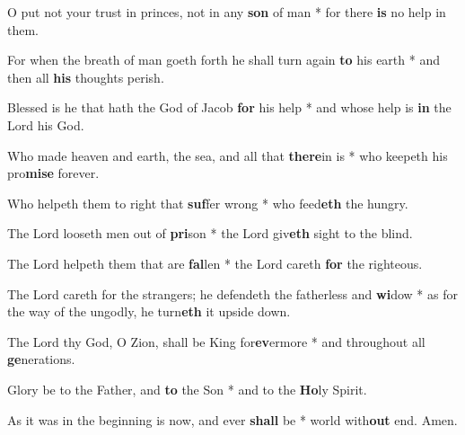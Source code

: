 \begin{multicols}{2}
	O put not your trust in princes, not in any \textbf{son} of man * for there \textbf{is} no help in them.
	
	For when the breath of man goeth forth he shall turn again \textbf{to} his earth * and then all \textbf{his} thoughts perish.
	
	Blessed is he that hath the God of Jacob \textbf{for} his help * and whose help is \textbf{in} the Lord his God.
	
	Who made heaven and earth, the sea, and all that \textbf{there}in is * who keepeth his pro\textbf{mise} forever.
	
	Who helpeth them to right that \textbf{suf}fer wrong * who feed\textbf{eth} the hungry.
	
	The Lord looseth men out of \textbf{pri}son * the Lord giv\textbf{eth} sight to the blind.
	
	The Lord helpeth them that are \textbf{fal}len * the Lord careth \textbf{for} the righteous.
	
	The Lord careth for the strangers; he defendeth the fatherless and \textbf{wi}dow * as for the way of the ungodly, he turn\textbf{eth} it upside down.
	
	The Lord thy God, O Zion, shall be King for\textbf{ev}ermore * and throughout all \textbf{ge}nerations.
	
	Glory be to the Father, and \textbf{to} the Son * and to the \textbf{Ho}ly Spirit.
	
	As it was in the beginning is now, and ever \textbf{shall} be * world with\textbf{out} end. Amen.
\end{multicols}
